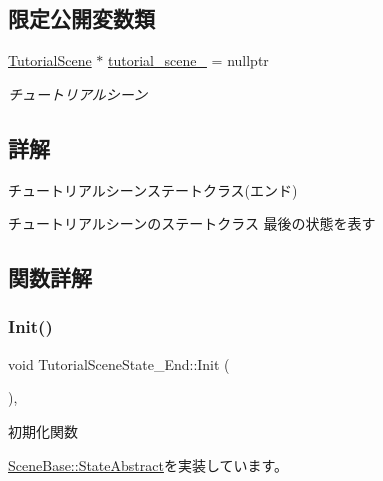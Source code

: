 \subsection*{限定公開変数類}
\begin{DoxyCompactItemize}
\item 
\mbox{\hyperlink{class_tutorial_scene}{Tutorial\+Scene}} $\ast$ \mbox{\hyperlink{class_tutorial_scene_state___end_a68f36e80b530182a5b5d835425b7e829}{tutorial\+\_\+scene\+\_\+}} = nullptr
\begin{DoxyCompactList}\small\item\em チュートリアルシーン \end{DoxyCompactList}\end{DoxyCompactItemize}


\subsection{詳解}
チュートリアルシーンステートクラス(エンド) 

チュートリアルシーンのステートクラス 最後の状態を表す 

\subsection{関数詳解}
\mbox{\label{class_tutorial_scene_state___end_a572e5687140ff5ac43789f90462c05a5}} 
\subsubsection{\texorpdfstring{Init()}{Init()}}
{\footnotesize\ttfamily void Tutorial\+Scene\+State\+\_\+\+End\+::\+Init (\begin{DoxyParamCaption}{ }\end{DoxyParamCaption})\hspace{0.3cm}{\ttfamily [override]}, {\ttfamily [virtual]}}



初期化関数 



\mbox{\hyperlink{class_scene_base_1_1_state_abstract_a2f5ea12e789aa52df179e6df469b870d}{Scene\+Base\+::\+State\+Abstract}}を実装しています。

\mbox{\label{class_tutorial_scene_state___end_ada1a87235a021b40f8eca96e31879227}} 
